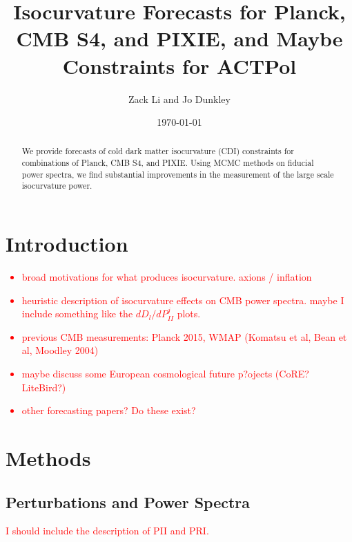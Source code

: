 \documentclass[11pt,a4paper]{emulateapj}
\newcommand\writingnote[1]{\textcolor{red}{#1}}
\begin{document}
\title{Isocurvature Forecasts for Planck, CMB S4, and PIXIE, and Maybe Constraints for ACTPol}
\author{Zack Li and Jo Dunkley}
\date{\today}


\begin{abstract}
We provide forecasts of cold dark matter isocurvature (CDI) constraints for combinations of Planck, CMB S4, and PIXIE. Using MCMC methods on fiducial power spectra, we find substantial improvements in the measurement of the large scale isocurvature power. 
\end{abstract}

\section{Introduction}

\writingnote{
\begin{itemize}
\item broad motivations for what produces isocurvature. axions / inflation
\item heuristic description of isocurvature effects on CMB power spectra. maybe I include something like the $dD_l/dP_{II}^j$ plots.
\item previous CMB measurements: Planck 2015, WMAP (Komatsu et al, Bean et al, Moodley 2004)
\item maybe discuss some European cosmological future p?ojects (CoRE? LiteBird?)
\item other forecasting papers? Do these exist?
\end{itemize}
}

\section{Methods}

\subsection{Perturbations and Power Spectra}
\writingnote{
I should include the description of PII and PRI.
}
\end{document}
